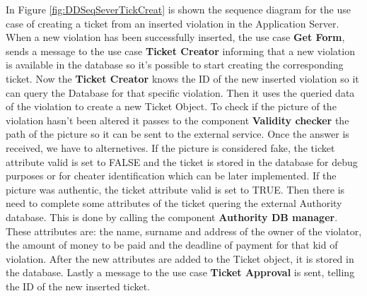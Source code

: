 In Figure \ref{fig:DDSeqSeverTickCreat} is shown the sequence diagram for the use case of creating a ticket from an inserted violation in the Application Server.
When a new violation has been successfully inserted, the use case \textbf{Get Form}, sends a message to the use case \textbf{Ticket Creator} informing that a new violation is available in the database so it's possible to start creating the corresponding ticket. Now the \textbf{Ticket Creator} knows the ID of the new inserted violation so it can query the Database for that specific violation. Then it uses the queried data of the violation to create a new Ticket Object. To check if the picture of the violation hasn't been altered it passes to the component \textbf{Validity checker} the path of the picture so it can be sent to the external service. Once the answer is received, we have to alternetives. If the picture is considered fake, the ticket attribute \textcolor{poliblue}{valid} is set to FALSE and the ticket is stored in the database for debug purposes or for cheater identification which can be later implemented.
If the picture was authentic, the ticket attribute \textcolor{poliblue}{valid} is set to TRUE. Then there is need to complete some attributes of the ticket quering the external Authority database. This is done by calling the component \textbf{Authority DB manager}. These attributes are: the name, surname and address of the owner of the violator, the amount of money to be paid and the deadline of payment for that kid of violation. After the new attributes are added to the Ticket object, it is stored in the database. Lastly a message to the use case \textbf{Ticket Approval} is sent, telling the ID of the new inserted ticket.

